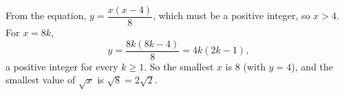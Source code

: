 From the equation, $y=\dfrac{x(x-4)}{8}$, which must be a positive integer, so $x>4$. For $x=8k$,
\[y=\dfrac{8k(8k-4)}{8}=4k(2k-1),\]
a positive integer for every $k\ge1$. So the smallest $x$ is $8$ (with $y=4$), and the smallest value of $\sqrt x$ is $\sqrt8=\boxed{2\sqrt2}$.
